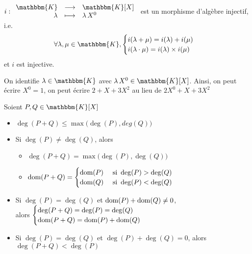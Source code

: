 \begin{prop}
	$i: \begin{array}{rcl}
		\mathbbm{K} &\longrightarrow& \mathbbm{K}[X] \\
		\lambda &\longmapsto& \lambda\,X^0
	\end{array}$ est un morphisme d'algèbre injectif, i.e. \[
		\forall \lambda, \mu \in  \mathbbm{K}, \begin{cases}
			i(\lambda+\mu) = i(\lambda)+i(\mu)\\
			i(\lambda\cdot\mu) = i(\lambda)\times i(\mu)\\
		\end{cases}
	\] et $i$ est injective.
\end{prop}

\begin{rmk}
	[Notation]
	On identifie $\lambda \in \mathbbm{K}$ avec $\lambda\,X^0 \in \mathbbm{K}[X]$. Ainsi, on peut écrire $X^0 = 1$, on peut écrire $2+X+3X^2$ au lieu de $2X^0 + X + 3X^2$
\end{rmk}

\begin{prop}
	Soient $P,Q \in \mathbbm{K}[X]$ \\
	\begin{itemize}
		\item $\deg(P+Q) \le \max\big(\deg(P), deg(Q)\big)$
		\item Si $\deg(P) \neq \deg(Q)$, alors
			\begin{itemize}
				\item $\deg(P+Q) = \max\big(\deg(P), \deg(Q)\big)$
				\item $\operatorname*{dom}(P+Q) = \begin{cases}
						\operatorname*{dom}(P) & \text{ si } \deg(P) > \deg(Q)\\
						\operatorname*{dom}(Q) & \text{ si } \deg(P) < \deg(Q)\\
				\end{cases}$
			\end{itemize}
		\item Si $\deg(P) = \deg(Q)$ et $\operatorname*{dom}(P) + \operatorname*{dom}(Q) \neq 0$, \\
				alors $\begin{cases}
				\deg(P + Q) = \deg(P) = \deg(Q)\\
				\operatorname*{dom}(P + Q) = \operatorname*{dom}(P) + \operatorname*{dom}(Q)\\
			\end{cases}$ 
		\item Si $\deg(P) = \deg(Q)$ et $\deg(P) + \deg(Q) = 0$, alors $\deg(P+Q) < \deg(P)$
	\end{itemize}
\end{prop}


